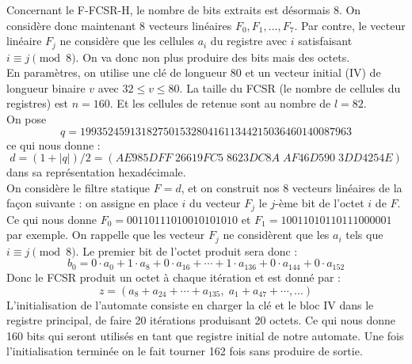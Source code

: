 \documentclass[11pt]{report}
\begin{document}
Concernant le F-FCSR-H, le nombre de bits extraits est désormais 8. On considère donc maintenant 8 vecteurs linéaires $F_0,F_1,...,F_7$. Par contre, le vecteur linéaire $F_j$ ne considère que les cellules $a_i$ du registre avec $i$ satisfaisant $i \equiv j \pmod 8$. On va donc non plus produire des bits mais des octets. \\
En paramètres, on utilise une clé de longueur 80 et un vecteur initial (IV) de longueur binaire $v$ avec $32 \leq v \leq 80$. La taille du FCSR (le nombre de cellules du registres) est $n=160$. Et les cellules de retenue sont au nombre de $l = 82$.
\\
On pose
$$
q=1993524591318275015328041611344215036460140087963$$
ce qui nous donne : 
$$
d=(1+|q|)/2 = (AE985DFF\; 26619FC5\; 8623DC8A\; AF46D590\; 3DD4254E)$$
dans sa représentation hexadécimale. 
\\
On considère le filtre statique $F=d$, et on construit nos 8 vecteurs linéaires de la façon suivante : on assigne en place $i$ du vecteur $F_j$ le $j$-ème bit de l'octet $i$ de $F$.
\\
Ce qui nous donne $F_0 = 00110111010010101010$ et $F_1= 10011010110111000001$ par exemple. 
On rappelle que les vecteur $F_j$ ne considèrent que les $a_i$ tels que $i \equiv j \pmod 8$. Le premier bit de l'octet produit sera donc : 
$$
b_0 = 0 \cdot a_0 + 1 \cdot a_8 + 0 \cdot a_{16} + \cdots + 1 \cdot a_{136} + 0 \cdot a_{144} + 0 \cdot a_{152}
$$
Donc le FCSR produit un octet à chaque itération et est donné par :
$$
z= (a_8+a_{24}+\cdots + a_{135},\; a_1 + a_{47} + \cdots, ...)
$$
L'initialisation de l'automate consiste en charger la clé et le bloc IV dans le registre principal, de faire 20 itérations produisant 20 octets. Ce qui nous donne 160 bits qui seront utilisés en tant que registre initial de notre automate. Une fois l'initialisation terminée on le fait tourner 162 fois sans produire de sortie. 
\end{document}
